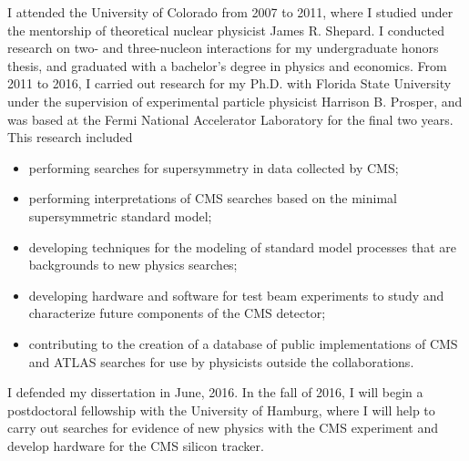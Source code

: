 \documentclass[12pt,expanded,copyright]{fsuthesis}
\begin{document}
%
%
%

%






\begin{biosketch}
I attended the University of Colorado from 2007 to 2011, where I studied under the mentorship of theoretical nuclear physicist James R. Shepard. I conducted research on two- and three-nucleon interactions for my undergraduate honors thesis, and graduated with a bachelor's degree in physics and economics. From 2011 to 2016, I carried out research for my Ph.D. with Florida State University under the supervision of experimental particle physicist Harrison B. Prosper, and was based at the Fermi National Accelerator Laboratory for the final two years. This research included
\begin{itemize}
\item performing searches for supersymmetry in data collected by CMS;
\item performing interpretations of CMS searches based on the minimal supersymmetric standard model;
\item developing techniques for the modeling of standard model processes that are backgrounds to new physics searches;
\item developing hardware and software for test beam experiments to study and characterize future components of the CMS detector;
\item contributing to the creation of a database of public implementations of CMS and ATLAS searches for use by physicists outside the collaborations.
\end{itemize}
I defended my dissertation in June, 2016. In the fall of 2016, I will begin a postdoctoral fellowship with the University of Hamburg, where I will help to carry out searches for evidence of new physics with the CMS experiment and develop hardware for the CMS silicon tracker.
\end{biosketch}
\end{document}
